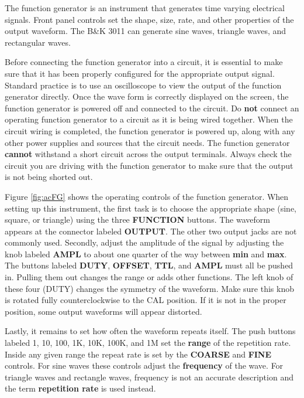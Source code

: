 The function generator is an instrument that generates time varying electrical signals. Front panel controls set the shape, size, rate, and other properties of the output waveform. The B\&K 3011 can generate sine waves, triangle waves, and rectangular waves.

Before connecting the function generator into a circuit, it is essential to make sure that it has been properly configured for the appropriate output signal. Standard practice is to use an oscilloscope to view the output of the function generator directly. Once the wave form is correctly displayed on the screen, the function generator is powered off and connected to the circuit. Do {\bf not} connect an operating function generator to a circuit as it is being wired together. When the circuit wiring is completed, the function generator is powered up, along with any other power supplies and sources that the circuit needs. The function generator {\bf cannot} withstand a short circuit across the output terminals. Always check the circuit you are driving with the function generator to make sure that the output is not being shorted out.

Figure \ref{fig:acFG} shows the operating controls of the function generator. When setting up this instrument, the first task is to choose the appropriate shape (sine, square, or triangle) using the three {\bf FUNCTION} buttons. The waveform appears at the connector labeled {\bf OUTPUT}. The other two output jacks are not commonly used. Secondly, adjust the amplitude of the signal by adjusting the knob labeled {\bf AMPL} to about one quarter of the way between {\bf min} and {\bf max}. The buttons labeled {\bf DUTY}, {\bf OFFSET}, {\bf TTL}, and {\bf AMPL} must all be pushed in. Pulling them out changes the range or adds other functions. The left knob of these four (DUTY) changes the symmetry of the waveform. Make sure this knob is rotated fully counterclockwise to the CAL position. If it is not in the proper position, some output waveforms will appear distorted.

Lastly, it remains to set how often the waveform repeats itself. The push buttons labeled 1, 10, 100, 1K, 10K, 100K, and 1M set the {\bf range} of the repetition rate. Inside any given range the repeat rate is set by the {\bf COARSE} and {\bf FINE} controls. For sine waves these controls adjust the {\bf frequency} of the wave. For triangle waves and rectangle waves, frequency is not an accurate description and the term {\bf repetition rate} is used instead. 

